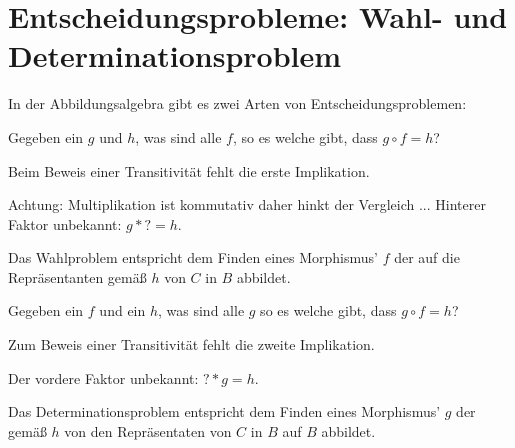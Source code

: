 \documentclass[parskip=half]{scrreprt}
\begin{document}
\section{Entscheidungsprobleme: Wahl- und Determinationsproblem}

In der Abbildungsalgebra gibt es zwei Arten von Entscheidungsproblemen:

\begin{definition}
Gegeben ein $g$ und $h$, was sind alle $f$, so es welche gibt,
dass $g ∘ f = h$?
\begin{analogon}[Logik]
Beim Beweis einer Transitivität fehlt die erste Implikation.
\end{analogon}
\begin{analogon}
Achtung: Multiplikation ist kommutativ daher hinkt der Vergleich ...
Hinterer Faktor unbekannt: $g * ? = h$. 
\end{analogon}
\end{definition}

\begin{remark}
Das Wahlproblem entspricht dem Finden eines Morphismus' $f$ der auf die 
Repräsentanten gemäß $h$ von $C$ in $B$ abbildet.
\end{remark}

\begin{definition}[Determinationsproblem]
Gegeben ein $f$ und ein $h$, was sind alle $g$ so es welche gibt,
dass $g ∘ f = h$?
\begin{analogon}[Logik]
Zum Beweis einer Transitivität fehlt die zweite Implikation.
\end{analogon}
\begin{analogon}
Der vordere Faktor unbekannt: $? * g = h$.
\end{analogon}
\end{definition}

\begin{remark}
Das Determinationsproblem entspricht dem Finden eines Morphismus' $g$ der 
gemäß $h$ von den Repräsentaten von $C$ in $B$ auf $B$ abbildet.
\end{remark}

\end{document}
